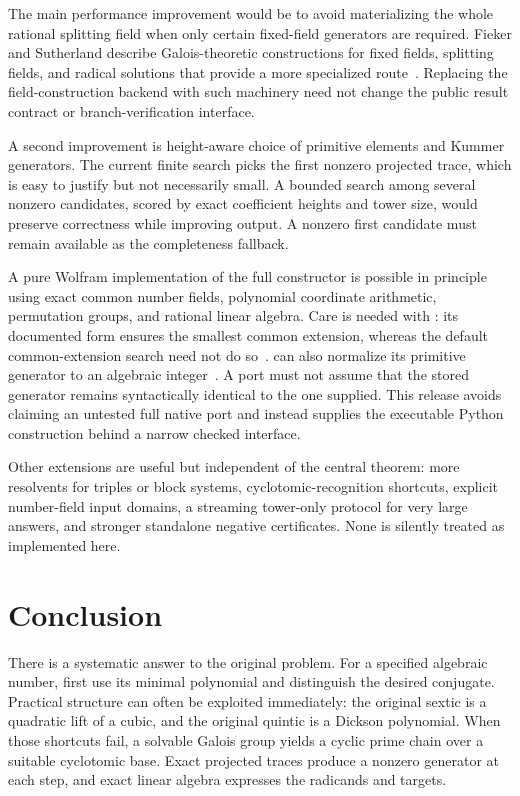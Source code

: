 \documentclass[11pt,a4paper]{article}
\newcommand{\code}[1]{\texttt{\detokenize{#1}}}
\theoremstyle{definition}
\theoremstyle{remark}
\begin{document}
The main performance improvement would be to avoid materializing the whole rational splitting field when only certain fixed-field generators are required. Fieker and Sutherland describe Galois-theoretic constructions for fixed fields, splitting fields, and radical solutions that provide a more specialized route~\cite{fieker}. Replacing the field-construction backend with such machinery need not change the public result contract or branch-verification interface.

A second improvement is height-aware choice of primitive elements and Kummer generators. The current finite search picks the first nonzero projected trace, which is easy to justify but not necessarily small. A bounded search among several nonzero candidates, scored by exact coefficient heights and tower size, would preserve correctness while improving output. A nonzero first candidate must remain available as the completeness fallback.

A pure Wolfram implementation of the full constructor is possible in principle using exact common number fields, polynomial coordinate arithmetic, permutation groups, and rational linear algebra. Care is needed with \code{ToNumberField}: its documented \code{All} form ensures the smallest common extension, whereas the default common-extension search need not do so~\cite{tonumberfield}. \code{AlgebraicNumber} can also normalize its primitive generator to an algebraic integer~\cite{algebraicnumber}. A port must not assume that the stored generator remains syntactically identical to the one supplied. This release avoids claiming an untested full native port and instead supplies the executable Python construction behind a narrow checked interface.

Other extensions are useful but independent of the central theorem: more resolvents for triples or block systems, cyclotomic-recognition shortcuts, explicit number-field input domains, a streaming tower-only protocol for very large answers, and stronger standalone negative certificates. None is silently treated as implemented here.

\section{Conclusion}

There is a systematic answer to the original problem. For a specified algebraic number, first use its minimal polynomial and distinguish the desired conjugate. Practical structure can often be exploited immediately: the original sextic is a quadratic lift of a cubic, and the original quintic is a Dickson polynomial. When those shortcuts fail, a solvable Galois group yields a cyclic prime chain over a suitable cyclotomic base. Exact projected traces produce a nonzero generator at each step, and exact linear algebra expresses the radicands and targets.
\end{document}
